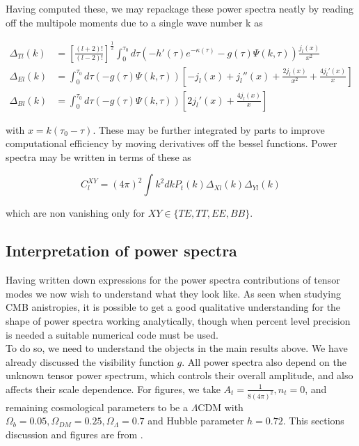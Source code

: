 \documentclass[a4paper,10pt]{article}
\newcommand{\half}{\frac{1}{2}}
\newcommand{\ltwo}{\left[\frac{(l+2)!}{(l-2)!}\right]}
\begin{document}
Having computed these, we may repackage these power spectra neatly by reading off the multipole moments due to a single wave number k as 

\begin{equation}
\begin{split}
\Delta_{Tl}(k) &= \ltwo^\half \int_0^{\tau_0} d\tau \left(-h'(\tau)e^{-\kappa(\tau)}-g(\tau)\Psi(k,\tau)\right)\frac{j_l(x)}{x^2}\\
\Delta_{El}(k) &= \int_0^{\tau_0}d\tau  \left(-g(\tau)\Psi(k,\tau)\right)\left[-j_l(x) +j_l''(x)+\frac{2j_l(x)}{x^2} + \frac{4j_l'(x)}{x}\right]\\
\Delta_{Bl}(k) &= \int_0^{\tau_0} d\tau \left(-g(\tau)\Psi(k,\tau)\right)\left[2j_l'(x)+\frac{4j_l(x)}{x}\right]
\end{split}
\end{equation}
 
with $x=k(\tau_0-\tau)$. These may be further integrated by parts to improve computational efficiency by moving derivatives off the bessel functions. Power spectra may be written in terms of these as 

\begin{equation}
C_l^{XY} = (4\pi)^2 \int k^2 dk P_t(k) \Delta_{Xl}(k)\Delta_{Yl}(k)
\end{equation}

which are non vanishing only for $XY \in \{TE, TT, EE, BB\}$. 

\subsection{Interpretation of power spectra}

Having written down expressions for the power spectra contributions of tensor modes we now wish to understand what they look like. As seen when studying CMB anistropies, it is possible to get a good qualitative understanding for the shape of power spectra working analytically, though when percent level precision is needed a suitable numerical code must be used.\\

To do so, we need to understand the objects in the main results above. We have already discussed the visibility function $g$. All power spectra also depend on the unknown tensor power spectrum, which controls their overall amplitude, and also affects their scale dependence. For figures, we take  $A_t = \frac{1}{8(4\pi)^2}, n_t=0$, and remaining cosmological parameters to be a $\Lambda$CDM with $\Omega_b=0.05, \Omega_{DM}=0.25, \Omega_\Lambda=0.7$ and Hubble parameter $h=0.72$. This sections discussion and figures are from \cite{Pritchard}.\\
\end{document}
